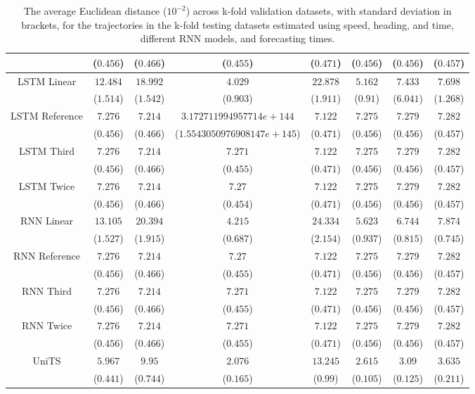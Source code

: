 \begin{table}[!ht]
{\begin{tabular}{|c|c|c|c|c|c|c|c|}
			 & ($0.456$) & ($0.466$) & ($0.455$) & ($0.471$) & ($0.456$) & ($0.456$) & ($0.457$) \\ \hline
			\multirow{2}{*}{LSTM Linear} & $12.484$ & $18.992$ & $4.029$ & $22.878$ & $5.162$ & $7.433$ & $7.698$ \\
			 & ($1.514$) & ($1.542$) & ($0.903$) & ($1.911$) & ($0.91$) & ($6.041$) & ($1.268$) \\ \hline
			\multirow{2}{*}{LSTM Reference} & $7.276$ & $7.214$ & $3.172711994957714e+144$ & $7.122$ & $7.275$ & $7.279$ & $7.282$ \\
			 & ($0.456$) & ($0.466$) & ($1.5543050976908147e+145$) & ($0.471$) & ($0.456$) & ($0.456$) & ($0.457$) \\ \hline
			\multirow{2}{*}{LSTM Third} & $7.276$ & $7.214$ & $7.271$ & $7.122$ & $7.275$ & $7.279$ & $7.282$ \\
			 & ($0.456$) & ($0.466$) & ($0.455$) & ($0.471$) & ($0.456$) & ($0.456$) & ($0.457$) \\ \hline
			\multirow{2}{*}{LSTM Twice} & $7.276$ & $7.214$ & $7.27$ & $7.122$ & $7.275$ & $7.279$ & $7.282$ \\
			 & ($0.456$) & ($0.466$) & ($0.454$) & ($0.471$) & ($0.456$) & ($0.456$) & ($0.457$) \\ \hline
			\multirow{2}{*}{RNN Linear} & $13.105$ & $20.394$ & $4.215$ & $24.334$ & $5.623$ & $6.744$ & $7.874$ \\
			 & ($1.527$) & ($1.915$) & ($0.687$) & ($2.154$) & ($0.937$) & ($0.815$) & ($0.745$) \\ \hline
			\multirow{2}{*}{RNN Reference} & $7.276$ & $7.214$ & $7.27$ & $7.122$ & $7.275$ & $7.279$ & $7.282$ \\
			 & ($0.456$) & ($0.466$) & ($0.455$) & ($0.471$) & ($0.456$) & ($0.456$) & ($0.457$) \\ \hline
			\multirow{2}{*}{RNN Third} & $7.276$ & $7.214$ & $7.271$ & $7.122$ & $7.275$ & $7.279$ & $7.282$ \\
			 & ($0.456$) & ($0.466$) & ($0.455$) & ($0.471$) & ($0.456$) & ($0.456$) & ($0.457$) \\ \hline
			\multirow{2}{*}{RNN Twice} & $7.276$ & $7.214$ & $7.271$ & $7.122$ & $7.275$ & $7.279$ & $7.282$ \\
			 & ($0.456$) & ($0.466$) & ($0.455$) & ($0.471$) & ($0.456$) & ($0.456$) & ($0.457$) \\ \hline
			\multirow{2}{*}{UniTS} & $5.967$ & $9.95$ & $2.076$ & $13.245$ & $2.615$ & $3.09$ & $3.635$ \\
			 & ($0.441$) & ($0.744$) & ($0.165$) & ($0.99$) & ($0.105$) & ($0.125$) & ($0.211$) \\ \hline
		\end{tabular}
	}
	\caption{The average Euclidean distance ($10^{-2}$) across k-fold validation datasets, with standard deviation in brackets, for the trajectories in the k-fold testing datasets estimated using speed, heading, and time, different RNN models, and forecasting times.}
	\label{tab:all_speed_actual_dir_euclid}
\end{table}

